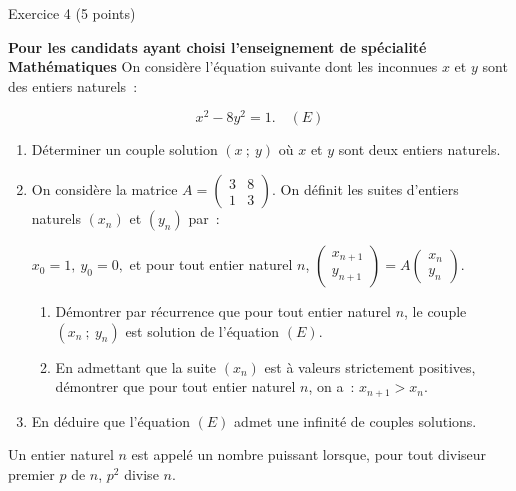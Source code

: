 
%
\begin{h2}Exercice 4 (5 points)\end{h2}
\par
\textbf{Pour les candidats ayant choisi l'enseignement de spécialité \og Mathématiques \fg{} }
\bigbreak
{}
\medbreak
On considère l'équation suivante dont les inconnues $x$ et $y$ sont des entiers naturels~:
\par
\[x^2 - 8y^2 = 1 . \quad(E)\]
\medbreak
\begin{enumerate}
     \item Déterminer un couple solution $(x~;~y)$ où $x$ et $y$ sont deux entiers naturels.
     \item  On considère la matrice $A = \begin{pmatrix}3&8\\1&3\end{pmatrix}$.
     On définit les suites d'entiers naturels $\left(x_n\right)$ et $\left(y_n\right)$ par~:
     \par
     \begin{center}
          $x_0 = 1,\: y_0 = 0,$ et pour tout entier naturel $n$, $\begin{pmatrix} x_{n+1}\\y_{n+1}\end{pmatrix} = A\begin{pmatrix}x_{n}\\y_{n}\end{pmatrix}.$
     \end{center}
     \begin{enumerate}[label=\alph*.]
          \item Démontrer par récurrence que pour tout entier naturel $n$, le couple
          $\left(x_n~;~y_n\right)$ est solution de l'équation $(E)$.
          \item En admettant que la suite $\left(x_n\right)$ est à valeurs strictement positives, démontrer que pour tout entier naturel $n$, on a~: $x_{n+1} > x_n$.
     \end{enumerate}
     \item  En déduire que l'équation $(E)$ admet une infinité de couples solutions.
\end{enumerate}
\bigbreak
{}
\medbreak
Un entier naturel $n$ est appelé un nombre puissant lorsque, pour tout diviseur premier $p$ de $n$,\: $p^2$ divise $n$.
